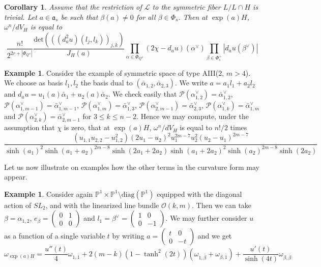 \documentclass{amsart}
\newtheorem{cor}[thm]{Corollary}
\theoremstyle{definition}
\newtheorem{exa}[thm]{Example}
\begin{document}
\begin{cor}
\label{cor_MA}
Assume that the restriction of $\mathcal{L}$ to the symmetric 
fiber $L/L\cap H$ is trivial.  
Let $a\in \mathfrak{a}_s$ be such that $\beta(a)\neq 0$ for all 
$\beta \in \Phi_s$. Then at $\exp(a)H$, $\omega^n/dV_H$ is equal 
to  
\[
\frac{n!}{2^{2r+|\Phi_{Q^u}|}} \frac{\mathrm{det}(((d_a^2u)(l_j,l_k))_{j,k})}{J_H(a)} 
\prod_{\alpha\in \Phi_{Q^u}} 
(2\chi-d_au)(\alpha^{\vee}) 
\prod_{\beta \in \Phi_s^+} |d_au(\beta^{\vee})|
 \]
\end{cor}

\begin{exa}
\label{exa_MA_AIII}
Consider the example of symmetric space of type AIII($2$, $m>4$). 
We choose as basis $l_1, l_2$ the basis dual to $(\bar{\alpha}_{1,2},\bar{\alpha}_{2,3})$.
We write $a=a_1l_1+a_2l_2$ and $d_au=u_1(a)\bar{\alpha}_1+u_2(a)\bar{\alpha}_2$.
We check easily that 
$\mathcal{P}(\alpha_{1,2}^{\vee})=\bar{\alpha}_{1,2}^{\vee}$, 
$\mathcal{P}(\alpha_{1,m-1}^{\vee})=\bar{\alpha}_{1,m-1}^{\vee}$,
$\mathcal{P}(\alpha_{1,m}^{\vee})=\bar{\alpha}_{1,3}^{\vee}$,
$\mathcal{P}(\alpha_{2,m-1}^{\vee})=\bar{\alpha}_{2,3}^{\vee}$, 
$\mathcal{P}(\alpha_{1,k}^{\vee})=\bar{\alpha}_{1,m}^{\vee}$ and 
$\mathcal{P}(\alpha_{2,k}^{\vee})=\bar{\alpha}_{2,m-1}^{\vee}$ 
for $3\leq k \leq n-2$. Hence we may compute, under the assumption 
that $\chi$ is zero, that at $\exp(a)H$, $\omega^n/dV_H$ is equal 
to $n!/2$ times 
\[
\frac{(u_{1,1}u_{2,2}-u_{1,2}^2)(2u_1-u_2)^2u_1^{2m-7}u_2^2(u_2-u_1)^{2m-7}}
{\sinh(a_1)^2\sinh(a_1+a_2)^{2m-8}\sinh(2a_1+2a_2)\sinh(a_1+2a_2)^2\sinh(a_2)^{2m-8}\sinh(2a_2)}
\]
\end{exa}

Let us now illustrate on examples how the other terms in the curvature form 
may appear. 

\begin{exa}
\label{exa_curv_P1xP1}
Consider again $\mathbb{P}^1\times \mathbb{P}^1\setminus \mathrm{diag}(\mathbb{P}^1)$
equipped with the diagonal action of $SL_2$, and with the linearized line bundle 
$\mathcal{O}(k,m)$.
Then we can take $\beta=\alpha_{1,2}$, 
$e_{\beta}=(\begin{smallmatrix}0&1\\0&0\end{smallmatrix})$ 
and $l_1=\beta^{\vee}=(\begin{smallmatrix} 1&0\\0&-1\end{smallmatrix})$. 
We may further consider $u$ as a function of a single variable $t$ by 
writing $a=(\begin{smallmatrix}t&0\\0&-t\end{smallmatrix})$ and we get 
\[
\omega_{\exp(a)H}=\frac{u''(t)}{4}\omega_{1,\bar{1}}
+2(m-k)(1-\tanh^2(2t))(\omega_{1,\bar{\beta}}+\omega_{\beta,\bar{1}})
+\frac{u'(t)}{\sinh(4t)}\omega_{\beta,\bar{\beta}}
\]
\end{exa}
\end{document}
